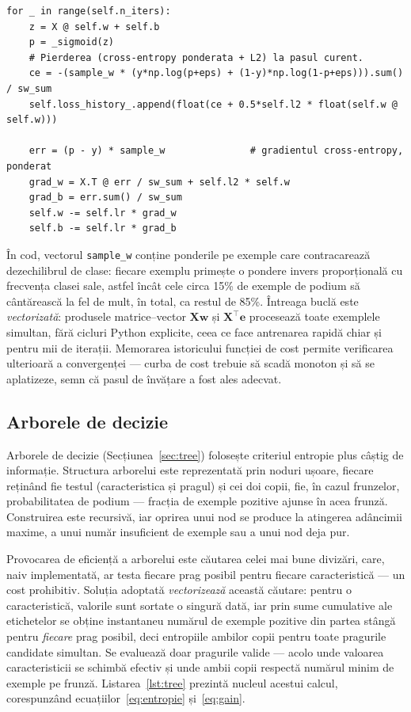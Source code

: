 \documentclass[12pt,a4paper]{report}
\begin{document}
\begin{lstlisting}[caption={Bucla de coborare pe gradient a regresiei logistice.}, label={lst:logreg}]
for _ in range(self.n_iters):
    z = X @ self.w + self.b
    p = _sigmoid(z)
    # Pierderea (cross-entropy ponderata + L2) la pasul curent.
    ce = -(sample_w * (y*np.log(p+eps) + (1-y)*np.log(1-p+eps))).sum() / sw_sum
    self.loss_history_.append(float(ce + 0.5*self.l2 * float(self.w @ self.w)))

    err = (p - y) * sample_w               # gradientul cross-entropy, ponderat
    grad_w = X.T @ err / sw_sum + self.l2 * self.w
    grad_b = err.sum() / sw_sum
    self.w -= self.lr * grad_w
    self.b -= self.lr * grad_b
\end{lstlisting}

În cod, vectorul \texttt{sample\_w} conține ponderile pe exemple care contracarează dezechilibrul
de clase: fiecare exemplu primește o pondere invers proporțională cu frecvența clasei sale, astfel
încât cele circa 15\% de exemple de podium să cântărească la fel de mult, în total, ca restul de
85\%. Întreaga buclă este \emph{vectorizată}: produsele matrice--vector $\mathbf{X}\mathbf{w}$ și
$\mathbf{X}^\top \mathbf{e}$ procesează toate exemplele simultan, fără cicluri Python explicite,
ceea ce face antrenarea rapidă chiar și pentru mii de iterații. Memorarea istoricului funcției de
cost permite verificarea ulterioară a convergenței --- curba de cost trebuie să scadă monoton și
să se aplatizeze, semn că pasul de învățare a fost ales adecvat.

\subsection{Arborele de decizie}

Arborele de decizie (Secțiunea~\ref{sec:tree}) folosește criteriul entropie plus câștig de
informație. Structura arborelui este reprezentată prin noduri ușoare, fiecare reținând fie testul
(caracteristica și pragul) și cei doi copii, fie, în cazul frunzelor, probabilitatea de podium ---
fracția de exemple pozitive ajunse în acea frunză. Construirea este recursivă, iar oprirea unui
nod se produce la atingerea adâncimii maxime, a unui număr insuficient de exemple sau a unui nod
deja pur.

Provocarea de eficiență a arborelui este căutarea celei mai bune divizări, care, naiv implementată,
ar testa fiecare prag posibil pentru fiecare caracteristică --- un cost prohibitiv. Soluția adoptată
\emph{vectorizează} această căutare: pentru o caracteristică, valorile sunt sortate o singură dată,
iar prin sume cumulative ale etichetelor se obține instantaneu numărul de exemple pozitive din
partea stângă pentru \emph{fiecare} prag posibil, deci entropiile ambilor copii pentru toate
pragurile candidate simultan. Se evaluează doar pragurile valide --- acolo unde valoarea
caracteristicii se schimbă efectiv și unde ambii copii respectă numărul minim de exemple pe frunză.
Listarea~\ref{lst:tree} prezintă nucleul acestui calcul, corespunzând ecuațiilor~\eqref{eq:entropie}
și~\eqref{eq:gain}.
\end{document}
